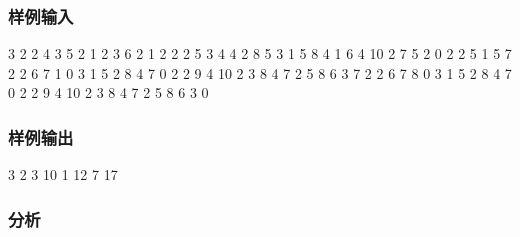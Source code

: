\subsubsection{样例输入}
\begin{Code}
3
2 2 4 3 5
2 1 2 3 6
2 1 2 2 2
5
3 4 4 2 8 5 3
1 5 8
4 1 6 4 10 2 7 5 2
0
2 2 5 1 5
7        
2 2 6 7 1
0  
3 1 5 2 8 4 7
0
2 2 9 4 10
2 3 8 4 7
2 5 8 6 3
7        
2 2 6 7 8
0  
3 1 5 2 8 4 7
0
2 2 9 4 10
2 3 8 4 7
2 5 8 6 3
0
\end{Code}

\subsubsection{样例输出}
\begin{Code}
3 2  
3 10
1 12
7 17
\end{Code}

\subsubsection{分析}

